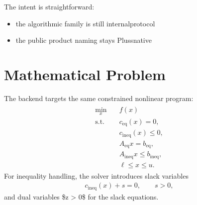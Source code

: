 \documentclass[letterpaper,10pt,english]{sphinxmanual}
\begin{document}
\sphinxAtStartPar
The intent is straightforward:
\begin{itemize}
\item {} 
\sphinxAtStartPar
the algorithmic family is still internal\sphinxhyphen{}protocol

\item {} 
\sphinxAtStartPar
the public product naming stays Pluss\sphinxhyphen{}native

\end{itemize}


\section{Mathematical Problem}
\label{\detokenize{optima_internal_protocol:mathematical-problem}}
\sphinxAtStartPar
The backend targets the same constrained nonlinear program:
\begin{equation*}
\begin{split}\begin{aligned}
\min_x \quad & f(x) \\
\text{s.t.} \quad & c_{\mathrm{eq}}(x) = 0, \\
& c_{\mathrm{ineq}}(x) \le 0, \\
& A_{\mathrm{eq}} x = b_{\mathrm{eq}}, \\
& A_{\mathrm{ineq}} x \le b_{\mathrm{ineq}}, \\
& \ell \le x \le u.
\end{aligned}\end{split}
\end{equation*}
\sphinxAtStartPar
For inequality handling, the solver introduces slack variables
\begin{equation*}
\begin{split}c_{\mathrm{ineq}}(x) + s = 0,\qquad s > 0,\end{split}
\end{equation*}
\sphinxAtStartPar
and dual variables \$z \textgreater{} 0\$ for the slack equations.
\end{document}
